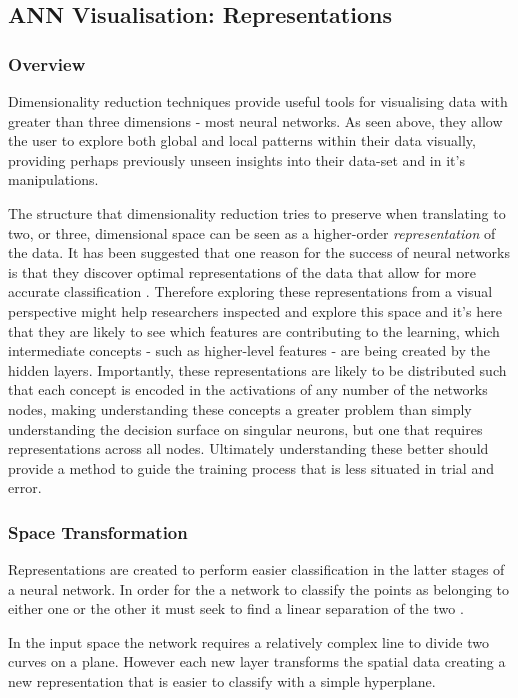 \documentclass[a4paper,11pt,titlepage]{article}
\begin{document}
	
	\subsection{ANN Visualisation: Representations}
		
		\subsubsection{Overview}
		Dimensionality reduction techniques provide useful tools for visualising data with greater than three dimensions - most neural networks. As seen above, they allow the user to explore both global and local patterns within their data visually, providing perhaps previously unseen insights into their data-set and in it's manipulations. 
		\par 	
		The structure that dimensionality reduction tries to preserve when translating to two, or three, dimensional space can be seen as a higher-order \textit{representation} of the data. It has been suggested that one reason for the success of neural networks is that they discover optimal representations of the data that allow for more accurate classification \cite{Hinton1986}. Therefore exploring these representations from a visual perspective might help researchers inspected and explore this space and it's here that they are likely to see which features are contributing to the learning, which intermediate concepts - such as higher-level features - are being created by the hidden layers. Importantly, these representations are likely to be distributed \cite{Hinton1986} such that each concept is encoded in the activations of any number of the networks nodes, making understanding these concepts a greater problem than simply understanding the decision surface on singular neurons, but one that requires representations across all nodes. Ultimately understanding these better should provide a method to guide the training process that is less situated in trial and error.
		\par 
		
		\subsubsection{Space Transformation}
	 	Representations are created to perform easier classification in the latter stages of a neural network. In order for the a network to classify the points as belonging to either one or the other it must seek to find a linear separation of the two \cite{Olah2014a}. 
		\par 
		In the input space the network requires a relatively complex line to divide two curves on a plane. However each new layer transforms the spatial data creating a new representation that is easier to classify with a simple hyperplane.
				
\end{document}
